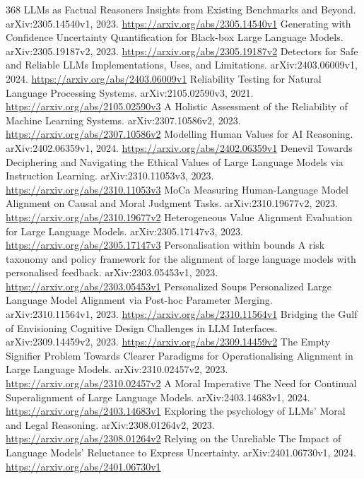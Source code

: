 \documentclass[11pt]{article}
\begin{document}
\begin{thebibliography}{368}
 LLMs as Factual Reasoners Insights from Existing Benchmarks and Beyond. arXiv:2305.14540v1, 2023. \url{https://arxiv.org/abs/2305.14540v1}
 Generating with Confidence Uncertainty Quantification for Black-box Large Language Models. arXiv:2305.19187v2, 2023. \url{https://arxiv.org/abs/2305.19187v2}
 Detectors for Safe and Reliable LLMs Implementations, Uses, and Limitations. arXiv:2403.06009v1, 2024. \url{https://arxiv.org/abs/2403.06009v1}
 Reliability Testing for Natural Language Processing Systems. arXiv:2105.02590v3, 2021. \url{https://arxiv.org/abs/2105.02590v3}
 A Holistic Assessment of the Reliability of Machine Learning Systems. arXiv:2307.10586v2, 2023. \url{https://arxiv.org/abs/2307.10586v2}
 Modelling Human Values for AI Reasoning. arXiv:2402.06359v1, 2024. \url{https://arxiv.org/abs/2402.06359v1}
 Denevil Towards Deciphering and Navigating the Ethical Values of Large Language Models via Instruction Learning. arXiv:2310.11053v3, 2023. \url{https://arxiv.org/abs/2310.11053v3}
 MoCa Measuring Human-Language Model Alignment on Causal and Moral Judgment Tasks. arXiv:2310.19677v2, 2023. \url{https://arxiv.org/abs/2310.19677v2}
 Heterogeneous Value Alignment Evaluation for Large Language Models. arXiv:2305.17147v3, 2023. \url{https://arxiv.org/abs/2305.17147v3}
 Personalisation within bounds A risk taxonomy and policy framework for the alignment of large language models with personalised feedback. arXiv:2303.05453v1, 2023. \url{https://arxiv.org/abs/2303.05453v1}
 Personalized Soups Personalized Large Language Model Alignment via Post-hoc Parameter Merging. arXiv:2310.11564v1, 2023. \url{https://arxiv.org/abs/2310.11564v1}
 Bridging the Gulf of Envisioning Cognitive Design Challenges in LLM Interfaces. arXiv:2309.14459v2, 2023. \url{https://arxiv.org/abs/2309.14459v2}
 The Empty Signifier Problem Towards Clearer Paradigms for Operationalising Alignment in Large Language Models. arXiv:2310.02457v2, 2023. \url{https://arxiv.org/abs/2310.02457v2}
 A Moral Imperative The Need for Continual Superalignment of Large Language Models. arXiv:2403.14683v1, 2024. \url{https://arxiv.org/abs/2403.14683v1}
 Exploring the psychology of LLMs' Moral and Legal Reasoning. arXiv:2308.01264v2, 2023. \url{https://arxiv.org/abs/2308.01264v2}
 Relying on the Unreliable The Impact of Language Models' Reluctance to Express Uncertainty. arXiv:2401.06730v1, 2024. \url{https://arxiv.org/abs/2401.06730v1}

\end{thebibliography}
\end{document}
